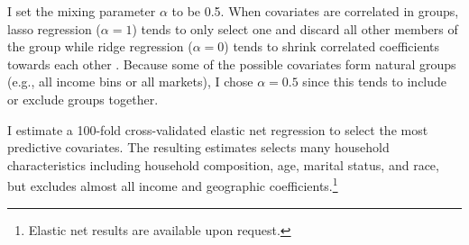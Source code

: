 \documentclass[AER]{AEA_mal}
\begin{document}
I set the mixing parameter $\alpha$ to be 0.5. When covariates are correlated in groups, lasso regression ($\alpha = 1$) tends to only select one and discard all other members of the group while ridge regression ($\alpha = 0$) tends to shrink correlated coefficients towards each other \citep{zou2005}. Because some of the possible covariates form natural groups (e.g., all income bins or all markets), I chose $\alpha = 0.5$ since this tends to include or exclude groups together.

I estimate a 100-fold cross-validated elastic net regression to select the most predictive covariates. The resulting estimates selects many household characteristics including household composition, age, marital status, and race, but excludes almost all income and geographic coefficients.\footnote{Elastic net results are available upon request.}
\end{document}
